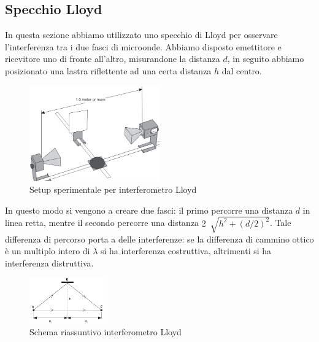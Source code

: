 \documentclass[letterpaper,12pt]{article}
\begin{document}
\subsection{Specchio Lloyd}
In questa sezione abbiamo utilizzato uno specchio di Lloyd per osservare l'interferenza tra i due fasci di microonde.
Abbiamo disposto emettitore e ricevitore uno di fronte all'altro, misurandone la distanza $d$, in seguito abbiamo
posizionato una lastra riflettente ad una certa distanza $h$ dal centro. \\
\begin{figure}[h!]
	\centering
	\includegraphics[width = 0.5\textwidth]{LloydSetup.png}
	\caption{Setup sperimentale per interferometro Lloyd}
	\label{fig:setupLloyd}
\end{figure}

In questo modo si vengono a creare due fasci: il primo percorre una distanza $d$ in linea retta, mentre il secondo
percorre una distanza $2\ \sqrt[]{h^2 + (d/2)^2}$. Tale differenza di percorso porta a delle interferenze:
se la differenza di cammino ottico è un multiplo intero di $\lambda$ si ha interferenza costruttiva,
altrimenti si ha interferenza distruttiva.\\
\begin{figure}[h!]
	\centering
	\includegraphics[width = 0.3\textwidth]{SchemaLloyd.png}
	\caption{Schema riassuntivo interferometro Lloyd}
	\label{fig:schemaLloyd}
\end{figure}
\end{document}
